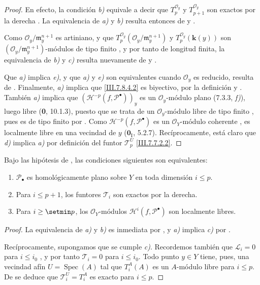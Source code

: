 \begin{proof}
En efecto, la condición \emph{b)} equivale a decir que $T_p^{\mathscr O_y}$ y $T_{p+1}^{\mathscr O_y}$
son exactos por la derecha . La equivalencia de \emph{a)}
y \emph{b)} resulta entonces de  y .

Como $\mathscr O_y/\mathfrak m_y^{n+1}$ es artiniano, y que
$T_p^{\mathscr O_y}(\mathscr O_y/\mathfrak m_y^{n+1})$ y
$T_p^{\mathscr O_y}(\boldsymbol{k}(y))$ son
$(\mathscr O_y/\mathfrak m_y^{n+1})$-módulos de tipo finito
, y por tanto de longitud finita, la equivalencia de
\emph{b)} y \emph{c)} resulta nuevamente de  y
.

Que \emph{a)} implica \emph{e)}, y que \emph{a)} y \emph{e)} son equivalentes cuando
$\mathscr O_y$ es reducido, resulta de .
Finalmente, \emph{a)} implica que \eqref{III.7.8.4.2} es biyectivo, por la
definición  y . También \emph{a)} implica que
$(\mathcal H^{-p}(f,\mathscr P^\bullet))_y$
es un $\mathscr O_y$-módulo plano (7.3.3, \emph{f)}), luego libre (\textbf{0}, 10.1.3), puesto que se trata de un $\mathscr O_y$-módulo libre de
tipo finito , pues es de tipo finito por
. Como $\mathcal H^{-p}(f,\mathscr P^\bullet)$ es
un $\mathscr O_Y$-módulo coherente , es localmente
libre en una vecindad de $y$
($\mathbf{0}_{\mathrm I}$, 5.2.7). Recíprocamente, está claro que \emph{d)} implica \emph{a)} por
definición del funtor $\mathscr T_p^U$ \eqref{III.7.7.2.2}.
\end{proof}

\begin{proposition}[7.8.5]
\label{III.7.8.5}
Bajo las hipótesis de \textup{}, las condiciones siguientes
son equivalentes:
\begin{enumerate}
  \item[\textup{a)}] $\mathscr P_\bullet$ es homológicamente plano sobre $Y$
    en toda dimensión $i\leq p$.
  \item[\textup{b)}] Para $i\leq p+1$, los funtores $\mathscr T_i$ son
    exactos por la derecha.
  \item[\textup{c)}] Para $i\geq\setmin p$, los $\mathscr O_Y$-módulos
    $\mathcal H^i(f,\mathscr P^\bullet)$ son localmente libres.
\end{enumerate}
\end{proposition}

\begin{proof}
La equivalencia de \emph{a)} y \emph{b)} es inmediata por , y \emph{a)}
implica \emph{c)} por .

Recíprocamente, supongamos que se cumple \emph{c)}. Recordemos también que
$\mathscr L_i=0$ para $i\leq i_0$ , y por tanto
$\mathscr T_i=0$ para $i\leq i_0$. Todo punto $y\in Y$ tiene, pues,
una vecindad afín $U=\operatorname{Spec}(A)$ tal que $T_i^A(A)$ es un $A$-módulo
libre para $i\leq p$. De  se deduce que
$\mathscr T_i^U=T_i^A$ es exacto para $i\leq p$.
\end{proof}


